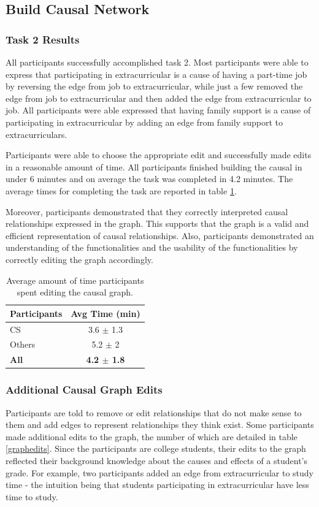 \subsection{ Build Causal Network }
\subsubsection{ Task 2 Results }
All participants successfully accomplished task 2. Most participants were able to express that participating in extracurricular is a cause of having a part-time job by reversing the edge from job to extracurricular, while just a few removed the edge from job to extracurricular and then added the edge from extracurricular to job. All participants were able expressed that having family support is a cause of participating in extracurricular by adding an edge from family support to extracurriculars.

Participants were able to choose the appropriate edit and successfully made edits in a reasonable amount of time. All participants finished building the causal in under 6 minutes and on average the task was completed in 4.2 minutes. The average times for completing the task are reported in table \ref{GraphEditTimes}.

Moreover, participants demonstrated that they correctly interpreted causal relationships expressed in the graph. This supports that the graph is a valid and efficient representation of causal relationships. Also, participants demonstrated an understanding of the functionalities and the usability of the functionalities by correctly editing the graph accordingly.

\begin{table}[]
\centering
\begin{tabular}{lc}
\hline
Participants & Avg Time (min) \\ \hline
CS           &        3.6 $\pm$ 1.3       \\
Others       &       5.2 $\pm$ 2        \\ \hline
\textbf{All} & \textbf{4.2 $\pm$ 1.8}    \\ \hline
\end{tabular}
\caption{Average amount of time participants spent editing the causal graph. }
\label{GraphEditTimes}
\end{table}

\subsubsection{ Additional Causal Graph Edits }
Participants are told to remove or edit relationships that do not make sense to them and add edges to represent relationships they think exist. Some participants made additional edits to the graph, the number of which are detailed in table \ref{graphedits}. Since the participants are college students, their edits to the graph reflected their background knowledge about the causes and effects of a student's grade. For example, two participants added an edge from extracurricular to study time - the intuition being that students participating in extracurricular have less time to study.

